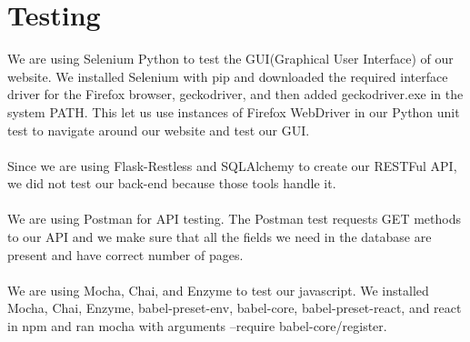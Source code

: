 \documentclass[12pt]{article}
\begin{document}
\section{Testing}

We are using Selenium Python to test the GUI(Graphical User Interface) of our website. We installed Selenium with pip and downloaded the required interface driver for the Firefox browser, geckodriver, and then added geckodriver.exe in the system PATH. This let us use instances of Firefox WebDriver in our Python unit test to navigate around our website and test our GUI.
\\
\\
Since we are using Flask-Restless and SQLAlchemy to create our RESTFul API, we did not test our back-end because those tools handle it.
\\
\\
We are using Postman for API testing. The Postman test requests GET methods to our API and we make sure that all the fields we need in the database are present and have correct number of pages. 
\\
\\
We are using Mocha, Chai, and Enzyme to test our javascript. We installed Mocha, Chai, Enzyme, babel-preset-env, babel-core, babel-preset-react, and react in npm and ran mocha with arguments --require babel-core/register.
\end{document}
